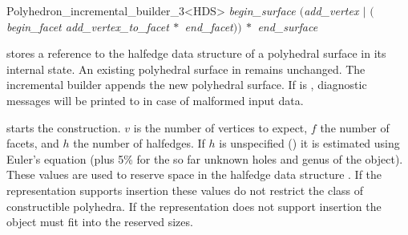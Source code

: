 \begin{ccRefClass}{Polyhedron_incremental_builder_3<HDS>}
{\it
    \hspace*{6mm} begin\_surface $($add\_vertex $|$ 
                  $($begin\_facet add\_vertex\_to\_facet$\:*$
                            end\_facet\/$))\:*$ end\_surface
}



\ccTypes


\ccGlue
{}
\ccGlue
{}

\ccCreation
{}
\ccThreeToTwo

 {stores a reference to the halfedge data structure  of a
   polyhedral surface in its internal state. An existing polyhedral
   surface in  remains unchanged. The incremental builder
   appends the new polyhedral surface. If  is ,
   diagnostic messages will be printed to  in case of
   malformed input data.}

\newpage
\ccOperations

{starts the construction. $v$ is the number of vertices
    to expect, $f$ the number of facets, and $h$ the number of
    halfedges. If $h$ is unspecified () it is estimated using
    Euler's equation (plus 5\% for the so far unknown holes and genus of
    the object). These values are used to reserve space in the
    halfedge data structure . If the representation supports
    insertion these values do not restrict the class of constructible
    polyhedra. If the representation does not support insertion the
    object must fit into the reserved sizes.}  

\ccGlue
{}
\ccGlue
{}
\ccGlue
{}
\ccGlue
{}

\ccGlue
{}


\end{ccRefClass}
